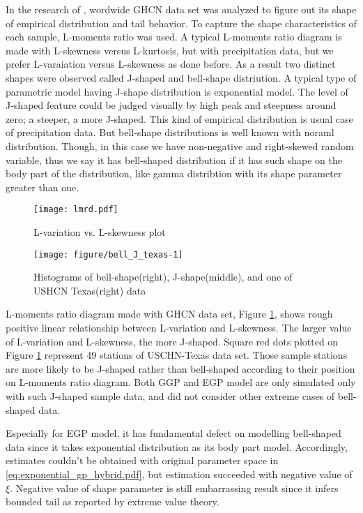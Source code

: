 \documentclass[12pt]{article}\usepackage[]{graphicx}\usepackage[]{color}
\makeatletter
\def\maxwidth{ %
  \ifdim\Gin@nat@width>\linewidth
    \linewidth
  \else
    \Gin@nat@width
  \fi
}
\makeatother
\begin{document}
In the research of \cite{papalexiou2012entropy}, wordwide GHCN data set was analyzed to figure out its shape of empirical distribution and tail behavior. To capture the shape characteristics of each sample, L-moments ratio was used. A typical L-moments ratio diagram is made with L-skewness versus L-kurtosis, but with precipitation data, but we prefer L-varaiation versus L-skewness as \cite{papalexiou2012entropy} done before. As a result two distinct shapes were observed called J-shaped and bell-shape distriution. A typical type of parametric model having J-shape distribution is exponential model. The level of J-shaped feature could be judged visually by high peak and steepness around zero; a steeper, a more J-shaped. This kind of empirical distribution is usual case of precipitation data. But bell-shape distributions is well known with noraml distribution. Though, in this case we have non-negative and right-skewed random variable, thus we say it has bell-shaped distribution if it has such shape on the body part of the distribution, like gamma distribtion with its shape parameter greater than one. 


\begin{figure}
  \label{fig:lmrd}
  \centering
  \texttt{[image: lmrd.pdf]}
  \caption{L-variation vs. L-skewness plot}
\end{figure}


\begin{figure}
\texttt{[image: figure/bell\_J\_texas-1]} \caption[Histograms of bell-shape(right), J-shape(middle), and one of USHCN Texas(right) data]{Histograms of bell-shape(right), J-shape(middle), and one of USHCN Texas(right) data}\label{fig:bell J texas}
\end{figure}




L-moments ratio diagram made with GHCN data set, Figure \ref{fig:lmrd}, shows rough positive linear relationship between L-variation and L-skewness. The larger value of L-variation and L-skewness, the more J-shaped. Square red dots plotted on Figure \ref{fig:lmrd} represent 49 stations of USCHN-Texas data set. Those sample stations are more likely to be J-shaped rather than bell-shaped according to their position on L-moments ratio diagram. Both GGP and EGP model are only simulated only with such J-shaped sample data, and did not consider other extreme cases of bell-shaped data. 

Especially for EGP model, it has fundamental defect on modelling bell-shaped data since it takes exponential distribution as its body part model. Accordingly, estimates couldn't be obtained with original parameter space in \ref{eq:exponential_gp_hybrid.pdf}, but estimation succeeded with negative value of $\xi$. Negative value of shape parameter is still embarrassing result since it infers bounded tail as reported by extreme value theory. 
\end{document}
